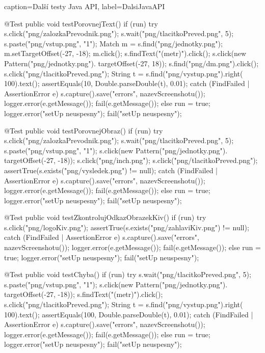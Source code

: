 \documentclass{bakalarka}
\begin{document}
\begin{lstjava}{caption={Další testy Java API}, label={DalsiJavaAPI}}
{  @Test
  public void testPorovnejText() {
    if (run) {
      try {
        s.click("png/zalozkaPrevodnik.png");
        s.wait("png/tlacitkoPreved.png", 5);
        s.paste("png/vstup.png", "1");
        Match m = s.find("png/jednotky.png");
        m.setTargetOffset(-27, -18);
        m.click();
        s.findText("(metr)").click();
        s.click(new Pattern("png/jednotky.png").
          targetOffset(-27, 18));
        s.find("png/dm.png").click();
        s.click("png/tlacitkoPreved.png");
        String t = s.find("png/vystup.png").right(
          100).text();
        assertEquals(10, Double.parseDouble(t),
          0.01);
      } catch (FindFailed | AssertionError e) {
        s.capture().save("errors",
          nazevScreenshotu());
        logger.error(e.getMessage());
        fail(e.getMessage());
      }
    } else {
      run = true;
      logger.error("setUp neuspesny");
      fail("setUp neuspesny");
    }
  }

  @Test
  public void testPorovnejObraz() {
    if (run) {
      try {
        s.click("png/zalozkaPrevodnik.png");
        s.wait("png/tlacitkoPreved.png", 5);
        s.paste("png/vstup.png", "1");
        s.click(new Pattern("png/jednotky.png").
          targetOffset(-27, -18));
        s.click("png/inch.png");
        s.click("png/tlacitkoPreved.png");
        assertTrue(s.exists("png/vysledek.png") !=
          null);
      } catch (FindFailed | AssertionError e) {
        s.capture().save("errors",
          nazevScreenshotu());
        logger.error(e.getMessage());
        fail(e.getMessage());
      }
    } else {
      run = true;
      logger.error("setUp neuspesny");
      fail("setUp neuspesny");
    }
  }

  @Test
  public void testZkontrolujOdkazObrazekKiv() {
    if (run) {
      try {
        s.click("png/logoKiv.png");
        assertTrue(s.exists("png/zahlaviKiv.png") !=
          null);
      } catch (FindFailed | AssertionError e) {
        s.capture().save("errors",
          nazevScreenshotu());
        logger.error(e.getMessage());
        fail(e.getMessage());
      }
    } else {
      run = true;
      logger.error("setUp neuspesny");
      fail("setUp neuspesny");
    }
  }

  @Test
  public void testChyba() {
    if (run) {
      try {
        s.wait("png/tlacitkoPreved.png", 5);
        s.paste("png/vstup.png", "1");
        s.click(new Pattern("png/jednotky.png").
          targetOffset(-27, -18));
        s.findText("(metr)").click();
        s.click("png/tlacitkoPreved.png");
        String t = s.find("png/vystup.png").right(
          100).text();
        assertEquals(100, Double.parseDouble(t),
          0.01);
      } catch (FindFailed | AssertionError e) {
        s.capture().save("errors",
          nazevScreenshotu());
        logger.error(e.getMessage());
        fail(e.getMessage());
      }
    } else {
      run = true;
      logger.error("setUp neuspesny");
      fail("setUp neuspesny");
    }
  }
}
		\end{lstjava}
		
\end{document}
